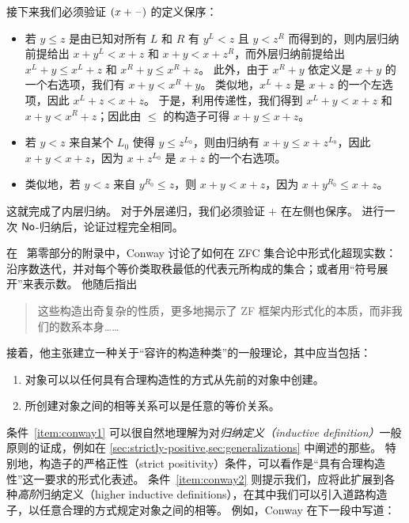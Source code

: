 \begin{eg}
接下来我们必须验证 $(x+\mathord{\hspace{1pt}\text{--}\hspace{1pt}})$ 的定义保序：
\begin{itemize}
\item 若 $y\le z$ 是由已知对所有 $L$ 和 $R$ 有 $y^L<z$ 且 $y<z^R$ 而得到的，则内层归纳前提给出 $x+y^L<x+z$ 和 $x+y < x+z^R$，而外层归纳前提给出 $x^L+y \le x^L+z$ 和 $x^R+ y \le x^R+z$。
  此外，由于 $x^R+y$ 依定义是 $x+y$ 的一个右选项，我们有 $x+y < x^R+y$。
  类似地，$x^L+z$ 是 $x+z$ 的一个左选项，因此 $x^L+z < x+z$。
  于是，利用传递性，我们得到 $x^L+y < x+z$ 和 $x+y < x^R+z$；因此由 $\le$ 的构造子可得 $x+y \le x+z$。
\item 若 $y<z$ 来自某个 $L_0$ 使得 $y\le z^{L_0}$，则由归纳有 $x+y \le x+z^{L_0}$，因此 $x+y<x+z$，因为 $x+z^{L_0}$ 是 $x+z$ 的一个右选项。
\item 类似地，若 $y<z$ 来自 $y^{R_0}\le z$，则 $x+y<x+z$，因为 $x+y^{R_0}\le x+z$。
\end{itemize}
这就完成了内层归纳。
对于外层递归，我们必须验证 $+$ 在左侧也保序。
进行一次 $\mathsf{No}$-归纳后，论证过程完全相同。
\end{eg}

%
%
在~\cite{conway:onag} 第零部分的附录中，Conway 讨论了如何在 ZFC 集合论中形式化超现实数：沿序数迭代，并对每个等价类取秩最低的代表元所构成的集合；或者用``符号展开''来表示数。
他随后指出

\begin{quote}\footnotesize
  这些构造出奇复杂的性质，更多地揭示了 ZF 框架内形式化的本质，而非我们的数系本身……
\end{quote}

接着，他主张建立一种关于``容许的构造种类''的一般理论，其中应当包括：

\begin{enumerate}\footnotesize
\item 对象可以以任何具有合理构造性的方式从先前的对象中创建。\label{item:conway1}
\item 所创建对象之间的相等关系可以是任意的等价关系。\label{item:conway2}
\end{enumerate}

\noindent
条件~\ref{item:conway1} 可以很自然地理解为对\emph{归纳定义（inductive definition）}一般原则的证成，例如在 \cref{sec:strictly-positive,sec:generalizations} 中阐述的那些。
特别地，构造子的严格正性（strict positivity）条件，可以看作是``具有合理构造性''这一要求的形式化表述。
条件~\ref{item:conway2} 则提示我们，应将此扩展到各种\emph{高阶}归纳定义（higher inductive definitions），在其中我们可以引入道路构造子，以任意合理的方式规定对象之间的相等。
例如，Conway 在下一段中写道：

